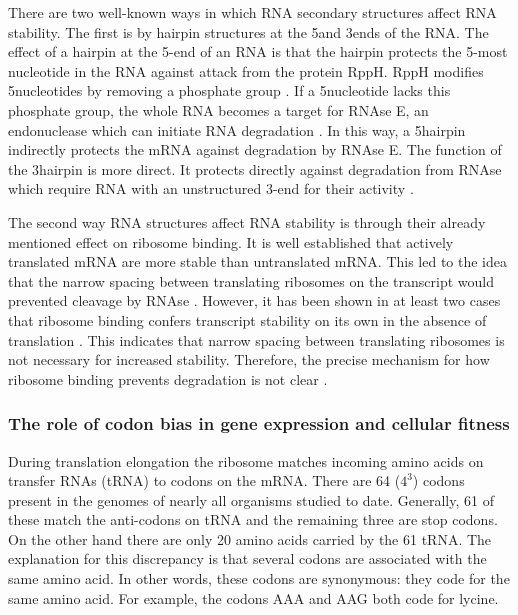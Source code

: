 There are two well-known ways in which RNA secondary structures affect RNA
stability. The first is by hairpin structures at the 5\ppp and 3\ppp ends of
the RNA. The effect of a hairpin at the 5\ppp-end of an RNA is that the hairpin
protects the 5\ppp-most nucleotide in the RNA against attack from the protein
RppH. RppH modifies 5\ppp nucleotides by removing a phosphate group
\cite{deana_bacterial_2008}. If a 5\ppp nucleotide lacks this phosphate group,
the whole RNA becomes a target for RNAse E, an endonuclease which
can initiate RNA degradation \cite{mackie_ribonuclease_1998}. In this way, a
5\ppp hairpin indirectly protects the mRNA against degradation by RNAse E. The
function of the 3\ppp hairpin is more direct. It protects directly against
degradation from RNAse which require RNA with an unstructured 3\ppp-end for
their activity \cite{rauhut_mrna_1999}.

The second way RNA structures affect RNA stability is through their already
mentioned effect on ribosome binding. It is well established that actively
translated mRNA are more stable than untranslated mRNA. This led to the idea
that the narrow spacing between translating ribosomes on the transcript would
prevented cleavage by RNAse \cite{deana_lost_2005}. However, it has been shown
in at least two cases that ribosome binding confers transcript stability on its
own in the absence of translation \cite{wagner_efficient_1994,
hambraeus_5_2002}. This indicates that narrow spacing between translating
ribosomes is not necessary for increased stability.  Therefore, the precise
mechanism for how ribosome binding prevents degradation is not clear
\cite{deana_lost_2005}.

\subsubsection{The role of codon bias in gene expression and cellular fitness}
During translation elongation the ribosome matches incoming amino acids on
transfer RNAs (tRNA) to codons on the mRNA. There are 64 ($4^3$) codons present
in the genomes of nearly all organisms studied to date. Generally, 61 of these
match the anti-codons on tRNA and the remaining three are stop codons. On the
other hand there are only 20 amino acids carried by the 61 tRNA. The
explanation for this discrepancy is that several codons are associated with the
same amino acid. In other words, these codons are synonymous: they code for the
same amino acid. For example, the codons AAA and AAG both code for lycine.

